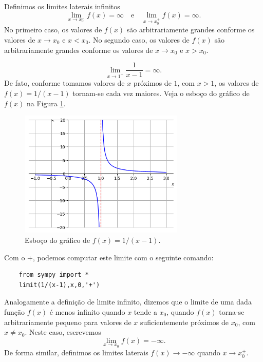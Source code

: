 Definimos os limites laterais infinitos
\begin{equation}
  \lim_{x\to x_0^-} f(x) = \infty\quad\text{e}\quad\lim_{x\to x_0^+} f(x) = \infty.
\end{equation}
No primeiro caso, os valores de $f(x)$ são arbitrariamente grandes conforme os valores de $x\to x_0$ e $x<x_0$. No segundo caso, os valores de $f(x)$ são arbitrariamente grandes conforme os valores de $x\to x_0$ e $x>x_0$.

\begin{ex}
  \begin{equation}
    \lim_{x\to 1^+} \frac{1}{x-1} = \infty.
  \end{equation}
  De fato, conforme tomamos valores de $x$ próximos de $1$, com $x>1$, os valores de $f(x) = 1/(x-1)$ tornam-se cada vez maiores. Veja o esboço do gráfico de $f(x)$ na Figura \ref{fig:ex_liminf_1x}.

\begin{figure}[H]
  \centering
  \includegraphics[width=0.7\textwidth]{./cap_lim/dados/fig_ex_liminf_1x/fig_ex_liminf_1x}
  \caption{Esboço do gráfico de $f(x)=1/(x-1)$.}
  \label{fig:ex_liminf_1x}
\end{figure}  

\ifispython
  Com o {\python}+{\sympy}, podemos computar este limite com o seguinte comando:
  \begin{lstlisting}
    from sympy import *
    limit(1/(x-1),x,0,'+')
  \end{lstlisting}
\fi
\end{ex}


Analogamente a definição de limite infinito, dizemos que o limite de uma dada função $f(x)$ é menos infinito quando $x$ tende a $x_0$, quando $f(x)$ torna-se arbitrariamente pequeno para valores de $x$ suficientemente próximos de $x_0$, com $x\neq x_0$. Neste caso, escrevemos
\begin{equation}
  \lim_{x\to x_0} f(x) = -\infty.
\end{equation}
De forma similar, definimos os limites laterais $f(x)\to -\infty$ quando $x\to x_0^{\pm}$.

